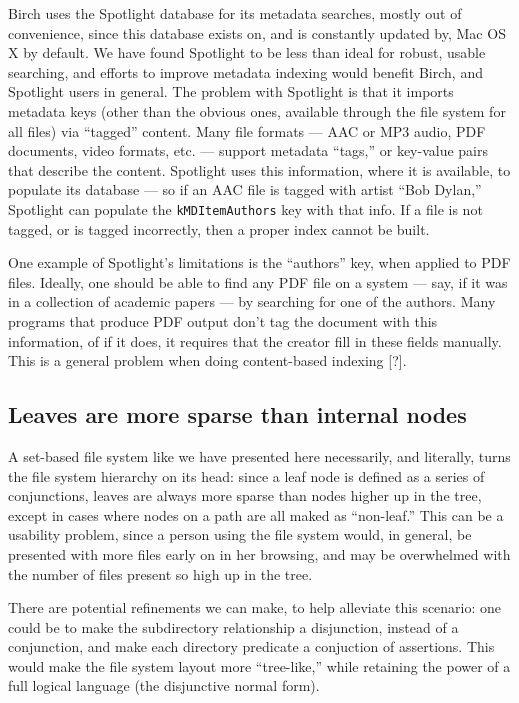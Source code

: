 \documentclass{article}
\begin{document}
Birch uses the Spotlight database for its metadata searches, mostly
out of convenience, since this database exists on, and is constantly
updated by, Mac OS X by default. We have found Spotlight to be less
than ideal for robust, usable searching, and efforts to improve
metadata indexing would benefit Birch, and Spotlight users in
general. The problem with Spotlight is that it imports metadata keys
(other than the obvious ones, available through the file system for
all files) via ``tagged'' content. Many file formats --- AAC or MP3
audio, PDF documents, video formats, etc. --- support metadata
``tags,'' or key-value pairs that describe the content. Spotlight uses
this information, where it is available, to populate its database ---
so if an AAC file is tagged with artist ``Bob Dylan,'' Spotlight can
populate the \texttt{kMDItemAuthors} key with that info. If a file is
not tagged, or is tagged incorrectly, then a proper index cannot be
built.

One example of Spotlight's limitations is the ``authors'' key, when
applied to PDF files. Ideally, one should be able to find any PDF
file on a system --- say, if it was in a collection of academic papers
--- by searching for one of the authors. Many programs that produce
PDF output don't tag the document with this information, of if it
does, it requires that the creator fill in these fields manually. This
is a general problem when doing content-based indexing [?].

\subsection{Leaves are more sparse than internal nodes}

A set-based file system like we have presented here necessarily, and
literally, turns the file system hierarchy on its head: since a leaf
node is defined as a series of conjunctions, leaves are always more
sparse than nodes higher up in the tree, except in cases where nodes
on a path are all maked as ``non-leaf.'' This can be a usability
problem, since a person using the file system would, in general, be
presented with more files early on in her browsing, and may be
overwhelmed with the number of files present so high up in the tree.

There are potential refinements we can make, to help alleviate this
scenario: one could be to make the subdirectory relationship a
disjunction, instead of a conjunction, and make each directory
predicate a conjuction of assertions. This would make the file system
layout more ``tree-like,'' while retaining the power of a full logical
language (the disjunctive normal form).
\end{document}

